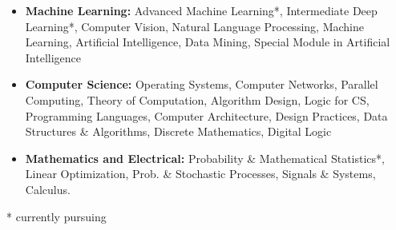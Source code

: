 
\begin{itemize}
\setlength\itemsep{-1em}
\item \textbf{Machine Learning:}
Advanced Machine Learning*, Intermediate Deep Learning*, Computer Vision, Natural Language Processing, Machine Learning, Artificial Intelligence, Data Mining, Special Module in Artificial Intelligence \\
\item \textbf{Computer Science:} 
Operating Systems, Computer Networks, Parallel Computing, Theory of Computation, Algorithm Design, Logic for CS, Programming Languages, Computer Architecture, Design Practices, Data Structures \& Algorithms, Discrete Mathematics, Digital Logic\\
\item \textbf{Mathematics and Electrical:}
Probability \& Mathematical Statistics*, Linear Optimization, Prob. \& Stochastic Processes, Signals \& Systems, Calculus.
\end{itemize}

* currently pursuing


